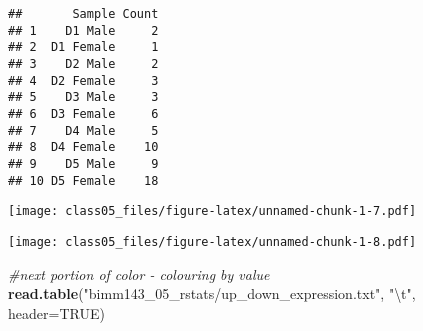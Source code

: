\documentclass[]{article}
\newenvironment{Shaded}{\begin{snugshade}}{\end{snugshade}}
\newcommand{\KeywordTok}[1]{\textcolor[rgb]{0.13,0.29,0.53}{\textbf{#1}}}
\newcommand{\DataTypeTok}[1]{\textcolor[rgb]{0.13,0.29,0.53}{#1}}
\newcommand{\DecValTok}[1]{\textcolor[rgb]{0.00,0.00,0.81}{#1}}
\newcommand{\CharTok}[1]{\textcolor[rgb]{0.31,0.60,0.02}{#1}}
\newcommand{\StringTok}[1]{\textcolor[rgb]{0.31,0.60,0.02}{#1}}
\newcommand{\CommentTok}[1]{\textcolor[rgb]{0.56,0.35,0.01}{\textit{#1}}}
\newcommand{\OtherTok}[1]{\textcolor[rgb]{0.56,0.35,0.01}{#1}}
\newcommand{\OperatorTok}[1]{\textcolor[rgb]{0.81,0.36,0.00}{\textbf{#1}}}
\newcommand{\NormalTok}[1]{#1}
\begin{document}
\begin{verbatim}
##       Sample Count
## 1    D1 Male     2
## 2  D1 Female     1
## 3    D2 Male     2
## 4  D2 Female     3
## 5    D3 Male     3
## 6  D3 Female     6
## 7    D4 Male     5
## 8  D4 Female    10
## 9    D5 Male     9
## 10 D5 Female    18
\end{verbatim}

\begin{Shaded}
\end{Shaded}

\texttt{[image: class05\_files/figure-latex/unnamed-chunk-1-7.pdf]}

\begin{Shaded}
\end{Shaded}

\texttt{[image: class05\_files/figure-latex/unnamed-chunk-1-8.pdf]}

\begin{Shaded}
\begin{Highlighting}[]
\CommentTok{#next portion of color - colouring by value}
\KeywordTok{read.table}\NormalTok{(}\StringTok{"bimm143_05_rstats/up_down_expression.txt"}\NormalTok{, }\StringTok{"}\CharTok{\textbackslash{}t}\StringTok{"}\NormalTok{, }\DataTypeTok{header=}\OtherTok{TRUE}\NormalTok{)}
\end{Highlighting}
\end{Shaded}
\end{document}
